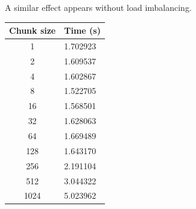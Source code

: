\documentclass{article}[12pt;letterpaper]
\begin{document}
A similar effect appears without load imbalancing.

\begin{tabular}{c l}
Chunk size & Time (s) \\
\hline{}
   1 & 1.702923 \\
   2 & 1.609537 \\
   4 & 1.602867 \\
   8 & 1.522705 \\
  16 & 1.568501 \\
  32 & 1.628063 \\
  64 & 1.669489 \\
 128 & 1.643170 \\
 256 & 2.191104 \\
 512 & 3.044322 \\
1024 & 5.023962
\end{tabular}

\includegraphics[width=0.3]{a2_sec2_2.png}
\end{document}
